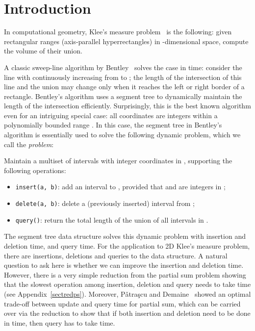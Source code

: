 \documentclass[11pt]{article}
\begin{document}
\newpage

\section{Introduction}
In computational geometry, Klee's measure problem~\cite{Klee77, Bent77, Chan13} is the following: given  rectangular ranges (axis-parallel hyperrectangles) in -dimensional space, compute the volume of their union.

A classic sweep-line algorithm by Bentley~\cite{Bent77} solves the  case in  time: consider the line  with  continuously increasing from  to ; the length of the intersection of this line and the union may change only when it reaches the left or right border of a rectangle. Bentley's algorithm uses a segment tree to dynamically maintain the length of the intersection efficiently. Surprisingly, this is the best known algorithm even for an intriguing special case: all coordinates are integers within a polynomially bounded range . In this case, the segment tree in Bentley's algorithm is essentially used to solve the following dynamic problem, which we call the \emph{\diu{} problem}:

Maintain a multiset  of intervals with integer coordinates in , supporting the following operations:

\begin{itemize}
	\item
		\verb+insert(a, b)+: add an interval  to , provided that  and  are integers in ;
	\item
		\verb+delete(a, b)+: delete a (previously inserted) interval  from ;
	\item
		\verb+query()+: return the total length of the union of all intervals in .
\end{itemize}

The segment tree data structure solves this dynamic problem with  insertion and deletion time, and  query time. For the application to 2D Klee's measure problem, there are  insertions,  deletions and  queries to the data structure. A natural question to ask here is whether we can improve the insertion and deletion time. However, there is a very simple reduction from the partial sum problem showing that the slowest operation among insertion, deletion and query needs to take  time (see Appendix~\ref{sectredps}). Moreover, P\v{a}tra\c{s}cu and Demaine~\cite{PD04b, PD06} showed an optimal trade-off between update and query time for partial sum, which can be carried over via the reduction to show that if both insertion and deletion need to be done in  time, then query has to take  time. 
\end{document}
